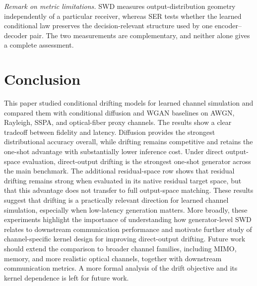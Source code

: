 \documentclass[conference]{IEEEtran}
\begin{document}
\smallskip
\noindent\textit{Remark on metric limitations.}
SWD measures output-distribution geometry independently of a particular receiver, whereas SER tests whether the learned conditional law preserves the decision-relevant structure used by one encoder--decoder pair. The two measurements are complementary, and neither alone gives a complete assessment.


%
\section{Conclusion}
This paper studied conditional drifting models for learned channel simulation and compared them with conditional diffusion and WGAN baselines on AWGN, Rayleigh, SSPA, and optical-fiber proxy channels. The results show a clear tradeoff between fidelity and latency. Diffusion provides the strongest distributional accuracy overall, while drifting remains competitive and retains the one-shot advantage with substantially lower inference cost. 
Under direct output-space evaluation, direct-output drifting is the strongest one-shot generator across the main benchmark. The additional residual-space row shows that residual drifting remains strong when evaluated in its native residual target space, but that this advantage does not transfer to full output-space matching. These results suggest that drifting is a practically relevant direction for learned channel simulation, especially when low-latency generation matters. More broadly, these experiments highlight the importance of understanding how generator-level SWD relates to downstream communication performance and motivate further study of channel-specific kernel design for improving direct-output drifting.
Future work should extend the comparison to broader channel families, including MIMO, memory, and more realistic optical channels, together with downstream communication metrics. A more formal analysis of the drift objective and its kernel dependence is left for future work.


\end{document}
